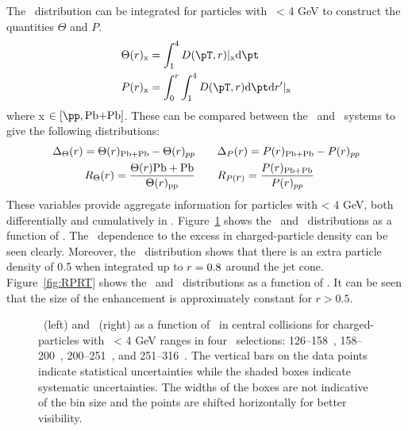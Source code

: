 The \Dptr\ distribution can be integrated for particles with \pt\ < 4 GeV to construct the quantities $\Theta$ and $P$.
\begin{align}
   \Theta(\rvar)_{\mathrm{x}} &= \int_1^{4} \Dptr |_{\mathrm{x}} \fd \pt \\
   P(\rvar)_{\mathrm{x}} &= \int_0^r \int_1^{4} \Dptr \fd \pt \fd r' |_{\mathrm{x}}
\end{align}
where x $\in [\pp, \pbpb]$. These can be compared between the \pp\ and \pbpb\ systems to give the following distributions:
\begin{align}
 \Delta_\Theta(\mbox{$r$}) = \Theta(\mbox{$r$})_{\mathrm{Pb+Pb}} - \Theta(\mbox{$r$})_{pp} & \qquad \Delta_P(\mbox{$r$}) = P(\mbox{$r$})_{\mathrm{Pb+Pb}} - P(\mbox{$r$})_{pp} \\
   R_\Theta(\mbox{$r$}) = \frac{\Theta(\mbox{$r$}){\mathrm{Pb+Pb}}}{\Theta(\mbox{$r$})_{\mathrm{pp}}} &  \qquad R_{P(\mbox{$r$})} = \frac{P(\mbox{$r$})_{\mathrm{Pb+Pb}}}{P(\mbox{$r$})_{pp}}
\end{align}
These variables provide aggregate information for particles with \pt < 4 GeV, both differentially and cumulatively in \rvar.
Figure~\ref{fig:deltaPdeltaT} shows the \DeltaTheta\ and \DeltaP\ distributions as a function of \rvar. The \ptjet\ dependence to the excess in charged-particle density can be seen clearly. Moreover, the \DeltaP\ distribution shows that there is an extra particle density of 0.5 when integrated up to $\mbox{$r$} = 0.8$ around the jet cone. Figure~\ref{fig:RPRT} shows the \RTheta\ and \RP\ distributions as a function of \rvar. It can be seen that the size of the enhancement is approximately constant for $r > 0.5$.

\begin{figure}
   \caption{\DeltaTheta\ (left) and \DeltaP\ (right) as a function of \rvar\ in central collisions for charged-particles with \pt\ < 4 GeV ranges in four \ptjet\ selections: 126--158~\GeV, 158--200~\GeV, 200--251~\GeV, and 251--316~\GeV. The vertical bars on the data points indicate statistical uncertainties while the shaded boxes indicate systematic uncertainties. The widths of the boxes are not indicative of the bin size and the points are shifted horizontally for better visibility. }
      \label{fig:deltaPdeltaT}
\end{figure}


